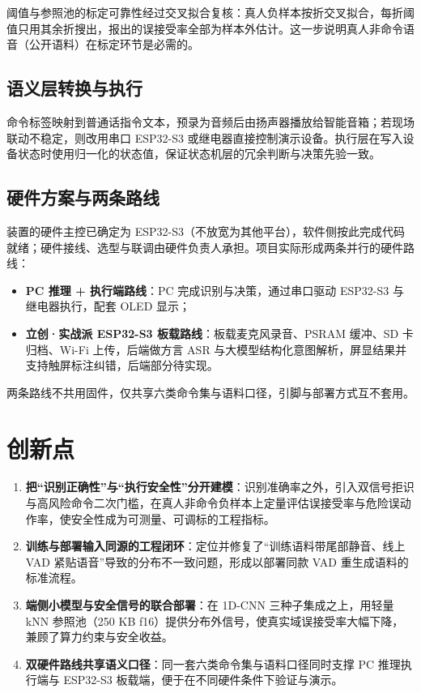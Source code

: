 \documentclass[UTF8,a4paper,12pt,fontset=fandol]{ctexart}
\begin{document}
阈值与参照池的标定可靠性经过交叉拟合复核：真人负样本按折交叉拟合，每折阈值只用其余折搜出，报出的误接受率全部为样本外估计。这一步说明真人非命令语音（公开语料）在标定环节是必需的。

\subsection{语义层转换与执行}

命令标签映射到普通话指令文本，预录为音频后由扬声器播放给智能音箱；若现场联动不稳定，则改用串口 ESP32-S3 或继电器直接控制演示设备。执行层在写入设备状态时使用归一化的状态值，保证状态机层的冗余判断与决策先验一致。

\subsection{硬件方案与两条路线}

装置的硬件主控已确定为 ESP32-S3（不放宽为其他平台），软件侧按此完成代码就绪；硬件接线、选型与联调由硬件负责人承担。项目实际形成两条并行的硬件路线：

\begin{itemize}[leftmargin=2em]
  \item \textbf{PC 推理 + 执行端路线}：PC 完成识别与决策，通过串口驱动 ESP32-S3 与继电器执行，配套 OLED 显示；
  \item \textbf{立创·实战派 ESP32-S3 板载路线}：板载麦克风录音、PSRAM 缓冲、SD 卡归档、Wi-Fi 上传，后端做方言 ASR 与大模型结构化意图解析，屏显结果并支持触屏标注纠错，后端部分待实现。
\end{itemize}

两条路线不共用固件，仅共享六类命令集与语料口径，引脚与部署方式互不套用。

\section{创新点}

\begin{enumerate}[leftmargin=2em]
  \item \textbf{把“识别正确性”与“执行安全性”分开建模}：识别准确率之外，引入双信号拒识与高风险命令二次门槛，在真人非命令负样本上定量评估误接受率与危险误动作率，使安全性成为可测量、可调标的工程指标。
  \item \textbf{训练与部署输入同源的工程闭环}：定位并修复了“训练语料带尾部静音、线上 VAD 紧贴语音”导致的分布不一致问题，形成以部署同款 VAD 重生成语料的标准流程。
  \item \textbf{端侧小模型与安全信号的联合部署}：在 1D-CNN 三种子集成之上，用轻量 kNN 参照池（250 KB f16）提供分布外信号，使真实域误接受率大幅下降，兼顾了算力约束与安全收益。
  \item \textbf{双硬件路线共享语义口径}：同一套六类命令集与语料口径同时支撑 PC 推理执行端与 ESP32-S3 板载端，便于在不同硬件条件下验证与演示。
\end{enumerate}
\end{document}
